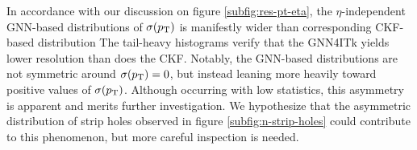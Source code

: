 \newpage
In accordance with our discussion on figure \ref{subfig:res-pt-eta}, the $\eta$-independent GNN-based distributions of $\sigma(p_{\text{T}})$ is manifestly wider than corresponding CKF-based distribution
The tail-heavy histograms verify that the GNN4ITk yields lower \pT resolution than does the CKF. 
Notably, the GNN-based distributions are not symmetric around $\sigma(p_{\text{T}})=0$, but instead leaning more heavily toward positive values of $\sigma(p_{\text{T}})$. 
Although occurring with low statistics, this asymmetry is apparent and merits further investigation.
We hypothesize that the asymmetric distribution of strip holes observed in figure \ref{subfig:n-strip-holes} could contribute to this phenomenon, but more careful inspection is needed.



